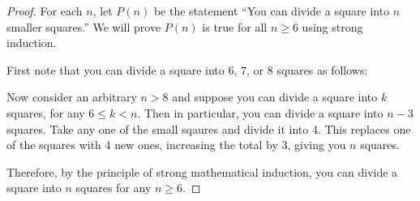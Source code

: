 \documentclass[10pt]{exam}
\begin{document}
\begin{questions}
\begin{solution}
  \begin{proof}
    For each $n$, let $P(n)$ be the statement ``You can divide a square into $n$ smaller squares.''  We will prove $P(n)$ is true for all $n \ge 6$ using strong induction.

    First note that you can divide a square into $6$, $7$, or $8$ squares as follows:

    \begin{center}
      \qquad
    \qquad
    \end{center}


    Now consider an arbitrary $n > 8$ and suppose you can divide a square into $k$ squares, for any $6 \le k < n$.  Then in particular, you can divide a square into $n-3$ squares.  Take any one of the small sqaures and divide it into 4.  This replaces one of the squares with 4 new ones, increasing the total by 3, giving you $n$ squares.

    Therefore, by the principle of strong mathematical induction, you can divide a square into $n$ squares for any $n \ge 6$.
  \end{proof}
\end{solution}

\end{questions}
\end{document}
